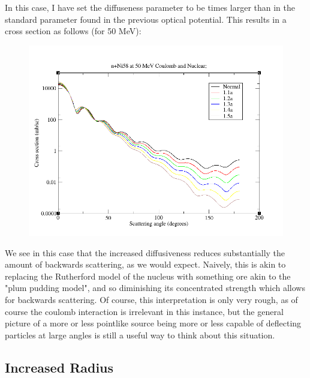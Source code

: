 \documentclass[paper=a4, fontsize=11pt]{scrartcl} %
\numberwithin{equation}{section} %
\numberwithin{figure}{section} %
\numberwithin{table}{section} %
\begin{document}
In this case, I have set the diffuseness parameter to be times larger than in the standard parameter found in the previous optical potential. This results in a cross section as follows (for 50 MeV):\\
\begin{figure}[!hbt]
\centering
\includegraphics[width=.6\textwidth]{NeutronDiff.png}
\end{figure}

We see in this case that the increased diffusiveness reduces substantially the amount of backwards scattering, as we would expect. Naively, this is akin to replacing the Rutherford model of the nucleus with something ore akin to the "plum pudding model", and so diminishing its concentrated strength which allows for backwards scattering. Of course, this interpretation is only very rough, as of course the coulomb interaction is irrelevant in this instance, but the general picture of a more or less pointlike source being more or less capable of deflecting particles at large angles is still a useful way to think about this situation.




\subsection{Increased Radius}
\end{document}
